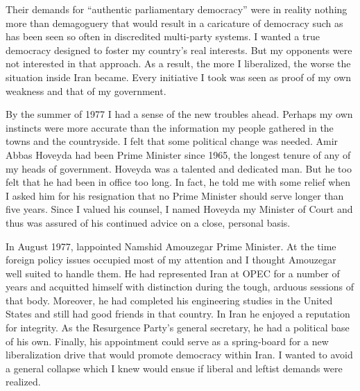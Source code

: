 Their demands for “authentic parliamentary democracy” were in reality nothing more than demagoguery that would result in a caricature of democracy such as has been seen so often in discredited multi-party systems. I wanted a true democracy designed to foster my country’s real interests. But my opponents were not interested in that approach. As a result, the more I liberalized, the worse the situation inside Iran became. Every initiative I took was seen as proof of my own weakness and that of my government. 

By the summer of 1977 I had a sense of the new troubles ahead. Perhaps my own instincts were more accurate than the information my people gathered in the towns and the countryside. I felt that some political change was needed. Amir Abbas Hoveyda had been Prime Minister since 1965, the longest tenure of any of my heads of government. Hoveyda was a talented and dedicated man. But he too felt that he had been in office too long. In fact, he told me with some relief when I asked him for his resignation that no Prime Minister should serve longer than five years. Since I valued his counsel, I named Hoveyda my Minister of Court and thus was assured of his continued advice on a close, personal basis. 

In August 1977, lappointed Namshid Amouzegar Prime Minister. At the time foreign policy issues occupied most of my attention and I thought Amouzegar well suited to handle them. He had represented Iran at OPEC for a number of years and acquitted himself with distinction during the tough, arduous sessions of that body. Moreover, he had completed his engineering studies in the United States and still had good friends in that country. In Iran he enjoyed a reputation for integrity. As the Resurgence Party's general secretary, he had a political base of his own. Finally, his appointment could serve as a spring-board for a new liberalization drive that would promote democracy within Iran. I wanted to avoid a general collapse which I knew would ensue if liberal and leftist demands were realized. 

